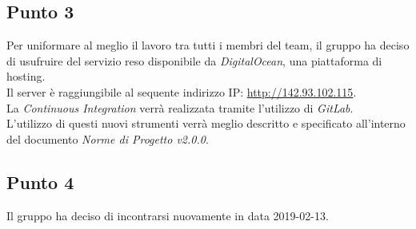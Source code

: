 \subsection{Punto 3}
Per uniformare al meglio il lavoro tra tutti i membri del team, il gruppo ha deciso di usufruire del servizio reso disponibile da \textit{DigitalOcean}, una piattaforma di hosting. \\
Il server è raggiungibile al sequente indirizzo IP: \url{http://142.93.102.115}. \\
La \textit{Continuous Integration} verrà realizzata tramite l'utilizzo di \textit{GitLab}\glossario. \\ 
L'utilizzo di questi nuovi strumenti verrà meglio descritto e specificato all'interno del documento \textit{Norme di Progetto v2.0.0}.\\

\subsection{Punto 4}
Il gruppo ha deciso di incontrarsi nuovamente in data 2019-02-13.